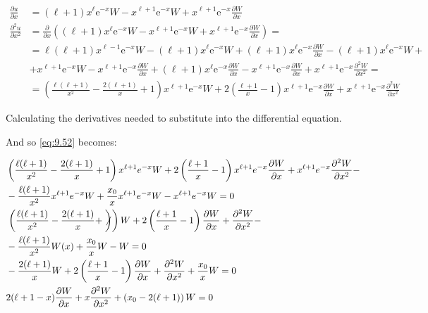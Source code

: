 \documentclass[italian]{HKNdocument}
\begin{document}
\begin{align}
\frac{\partial u}{\partial x} & =(\ell+1) x^{\ell} \mathrm{e}^{-x} W-x^{\ell+1} \mathrm{e}^{-x} W+x^{\ell+1} \mathrm{e}^{-x} \frac{\partial W}{\partial x} \\
\frac{\partial^{2} u}{\partial x^{2}} & =\frac{\partial}{\partial x}\left((\ell+1) x^{\ell} \mathrm{e}^{-x} W-x^{\ell+1} \mathrm{e}^{-x} W+x^{\ell+1} \mathrm{e}^{-x} \frac{\partial W}{\partial x}\right)= \\
& =\ell(\ell+1) x^{\ell-1} \mathrm{e}^{-x} W-(\ell+1) x^{\ell} \mathrm{e}^{-x} W+(\ell+1) x^{\ell} \mathrm{e}^{-x} \frac{\partial W}{\partial x}-(\ell+1) x^{\ell} \mathrm{e}^{-x} W+ \\
& +x^{\ell+1} \mathrm{e}^{-x} W-x^{\ell+1} \mathrm{e}^{-x} \frac{\partial W}{\partial x}+(\ell+1) x^{\ell} \mathrm{e}^{-x} \frac{\partial W}{\partial x}-x^{\ell+1} \mathrm{e}^{-x} \frac{\partial W}{\partial x}+x^{\ell+1} \mathrm{e}^{-x} \frac{\partial^{2} W}{\partial x^{2}}= \\
& =\left(\frac{\ell(\ell+1)}{x^{2}}-\frac{2(\ell+1)}{x}+1\right) x^{\ell+1} \mathrm{e}^{-x} W+2\left(\frac{\ell+1}{x}-1\right) x^{\ell+1} \mathrm{e}^{-x} \frac{\partial W}{\partial x}+x^{\ell+1} \mathrm{e}^{-x} \frac{\partial^{2} W}{\partial x^{2}}
\end{align}

Calculating the derivatives needed to substitute into the differential equation.

And so \eqref{eq:9.52} becomes:

\begin{align}
& \left(\frac{\ell(\ell+1)}{x^{2}}-\frac{2(\ell+1)}{x}+1\right) x^{\ell+1} e^{-x} W+2\left(\frac{\ell+1}{x}-1\right) x^{\ell+1} e^{-x} \frac{\partial W}{\partial x}+x^{\ell+1} e^{-x} \frac{\partial^{2} W}{\partial x^{2}}- \\
& -\frac{\ell(\ell+1)}{x^{2}} x^{\ell+1} e^{-x} W+\frac{x_{0}}{x} x^{\ell+1} e^{-x} W-x^{\ell+1} e^{-x} W=0 \\
& \left.\left(\frac{\ell(\ell+1)}{x^{2}}-\frac{2(\ell+1)}{x}+\not\right)\right) W+2\left(\frac{\ell+1}{x}-1\right) \frac{\partial W}{\partial x}+\frac{\partial^{2} W}{\partial x^{2}}- \\
& -\frac{\ell(\ell+1)}{x^{2}} W(x)+\frac{x_{0}}{x} W- W = 0 \\
& -\frac{2(\ell+1)}{x} W+2\left(\frac{\ell+1}{x}-1\right) \frac{\partial W}{\partial x}+\frac{\partial^{2} W}{\partial x^{2}}+\frac{x_{0}}{x} W=0 \\
& 2(\ell+1-x) \frac{\partial W}{\partial x}+x \frac{\partial^{2} W}{\partial x^{2}}+\left(x_{0}-2(\ell+1)\right) W=0
\end{align}
\end{document}
